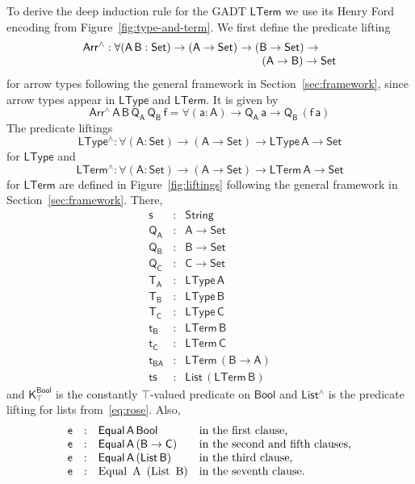 \documentclass[sigplan,screen]{acmart}
\begin{document}
To derive the deep induction rule for the GADT $\mathsf{LTerm}$ we use
its Henry Ford encoding from Figure~\ref{fig:type-and-term}.
We first define the predicate lifting
\[\begin{array}{l}
\mathsf{Arr^{\wedge} : \forall (A\, B : Set) \to (A \to Set) \to (B
  \to Set) \to}\\
\mathsf{\hspace*{2.2in}(A \to B) \to Set}
\end{array}\] for arrow types following the general framework in
Section~\ref{sec:framework}, since 
arrow types appear in $\mathsf{LType}$ and $\mathsf{LTerm}$.  It is
given by \[\mathsf{Arr^{\wedge}\, A\, B\, Q_A\, Q_B\, f = \forall (a :
  A) \to Q_A\,a \to Q_B\, (f\,a)}\] The predicate liftings
\[\mathsf{LType^{\wedge} : \forall (A : Set) \to (A \to Set) \to
  LType\,A \to Set}\] for $\mathsf{LType}$ and
\[\mathsf{LTerm^{\wedge}
  : \forall (A : Set) \to (A \to Set) \to LTerm\,A \to Set}\] for
$\mathsf{LTerm}$ are defined in Figure~\ref{fig:liftings} following
the general framework in Section~\ref{sec:framework}.  There,
\[
\begin{array}{lll}
\mathsf{s} & : & \mathsf{String} \\
\mathsf{Q_A} & : & \mathsf{A \to Set} \\
\mathsf{Q_B} & : & \mathsf{B \to Set} \\
\mathsf{Q_C} & : & \mathsf{C \to Set} \\
\mathsf{T_A} & : & \mathsf{LType\, A} \\
\mathsf{T_B} & : & \mathsf{LType\, B} \\
\mathsf{T_C} & : & \mathsf{LType\, C} \\
\mathsf{t_B} & : & \mathsf{LTerm \, B} \\
\mathsf{t_C} & : & \mathsf{LTerm \, C} \\
\mathsf{t_{BA}} & : & \mathsf{LTerm \, (B \to A)} \\
\mathsf{ts} & : & \mathsf{List\, (LTerm\, B)}
\end{array}
\]
and $\mathsf{K^{Bool}_{\top}}$ is the constantly
$\mathsf{\top}$-valued predicate on $\mathsf{Bool}$ and
$\mathsf{List^\wedge}$ is the predicate lifting for lists
from~\eqref{eq:rose}.  Also,
\[
\begin{array}{llll}
\mathsf{e} & : & \mathsf{Equal\,A\,Bool} & \text{in the first clause,} \\
\mathsf{e} & : & \mathsf{Equal\, A\, (B \to C)} & \text{in the second and fifth clauses,} \\
\mathsf{e} & : & \mathsf{Equal\, A\, (List\, B)} & \text{in the third clause,} \\
\mathsf{e} & : & \text{Equal\, A\, (List \,B)} & \text{in the seventh clause.}
\end{array}
\]
\end{document}
